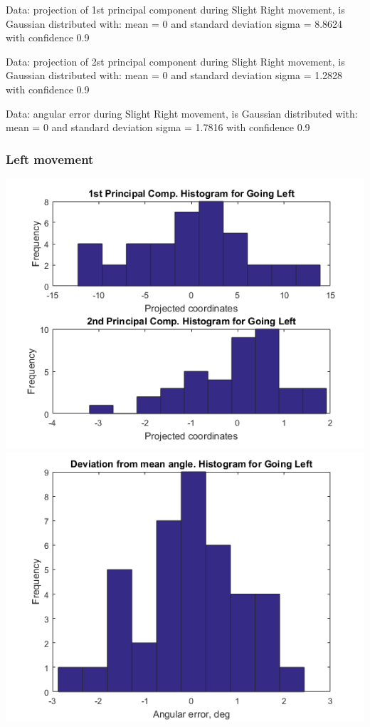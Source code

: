 \documentclass[a4paper, 12pt]{article}
\begin{document}
Data: projection of 1st principal component during  Slight Right movement, is Gaussian distributed with: mean = 0 and standard deviation sigma = 8.8624 with confidence 0.9%




\smallskip

Data: projection of 2st principal component during  Slight Right movement, is Gaussian distributed with: mean = 0 and standard deviation sigma = 1.2828 with confidence 0.9%




\smallskip


Data: angular error during   Slight Right movement, is Gaussian distributed with: mean = 0 and standard deviation sigma = 1.7816 with confidence 0.9%

\newpage
\subsubsection{Left movement}

\begin{center}
  \includegraphics[scale=0.6]{ll2}
  \includegraphics[scale=0.6]{ll3}
\end{center}
\end{document}
